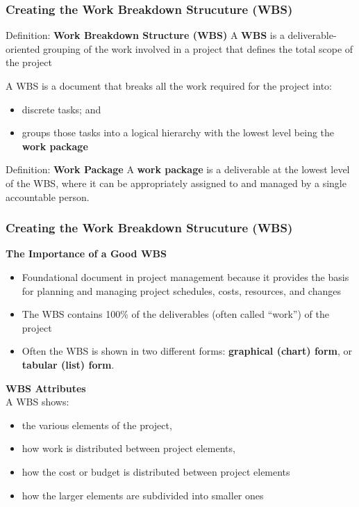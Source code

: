 \documentclass{beamer}
\begin{document}

\begin{frame}
\frametitle{Creating the Work Breakdown Strucuture (WBS)}
\begin{block}{Definition: \textbf{Work Breakdown Structure (WBS)}}
A \textbf{WBS} is a deliverable-oriented grouping of the work involved in a project that defines the total scope of the project
\end{block}
A WBS is a document that breaks all the work required for the project into:
\begin{itemize}
\item discrete tasks; and
\item groups those tasks into a logical hierarchy with the lowest level being the \textbf{work package}
\end{itemize}

\begin{block}{Definition: \textbf{Work Package}}
A \textbf{work package} is a deliverable at the lowest level of the WBS, where it can be appropriately assigned to and managed by a single accountable person.
\end{block}
\end{frame}


\begin{frame}
\frametitle{Creating the Work Breakdown Strucuture (WBS)}
\textbf{The Importance of a Good WBS}
\vspace{0.25cm}
\small
\begin{itemize} 
\item Foundational document in project management because it provides the basis for planning and managing project schedules, costs, resources, and changes
\item The WBS contains 100\% of the deliverables (often called “work”) of the project
\item Often the WBS is shown in two different forms: \textbf{graphical (chart) form}, or \textbf{tabular (list) form}.
\end{itemize}
\vspace{0.5cm}
\textbf{WBS Attributes}\\
\vspace{0.25cm}
\small A WBS shows:
\begin{itemize}
\item the various elements of the project, 
\item how work is distributed between project elements,
\item how the cost or budget is distributed between project elements
\item how the larger elements are subdivided into smaller ones
\end{itemize}
\end{frame}
\end{document}
